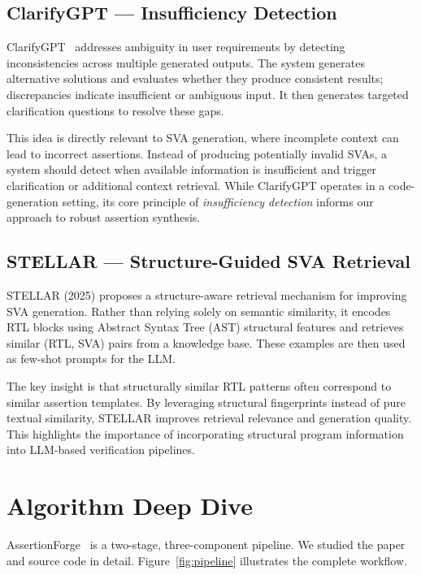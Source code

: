 \documentclass[12pt,a4paper]{article}
\begin{document}
\subsection{ClarifyGPT --- Insufficiency Detection}

ClarifyGPT~\cite{clarifygpt} addresses ambiguity in user requirements by
detecting inconsistencies across multiple generated outputs. The system
generates alternative solutions and evaluates whether they produce consistent
results; discrepancies indicate insufficient or ambiguous input. It then
generates targeted clarification questions to resolve these gaps.

This idea is directly relevant to SVA generation, where incomplete context can
lead to incorrect assertions. Instead of producing potentially invalid SVAs,
a system should detect when available information is insufficient and trigger
clarification or additional context retrieval. While ClarifyGPT operates in a
code-generation setting, its core principle of \emph{insufficiency detection}
informs our approach to robust assertion synthesis.

\subsection{STELLAR --- Structure-Guided SVA Retrieval}

STELLAR (2025) proposes a structure-aware retrieval mechanism for improving
SVA generation. Rather than relying solely on semantic similarity, it encodes
RTL blocks using Abstract Syntax Tree (AST) structural features and retrieves
similar (RTL, SVA) pairs from a knowledge base. These examples are then used
as few-shot prompts for the LLM.

The key insight is that structurally similar RTL patterns often correspond to
similar assertion templates. By leveraging structural fingerprints instead of
pure textual similarity, STELLAR improves retrieval relevance and generation
quality. This highlights the importance of incorporating structural program
information into LLM-based verification pipelines.

\section{Algorithm Deep Dive}

AssertionForge~\cite{assertionforge} is a two-stage, three-component pipeline.
We studied the paper and source code in detail. Figure~\ref{fig:pipeline}
illustrates the complete workflow.
\end{document}

